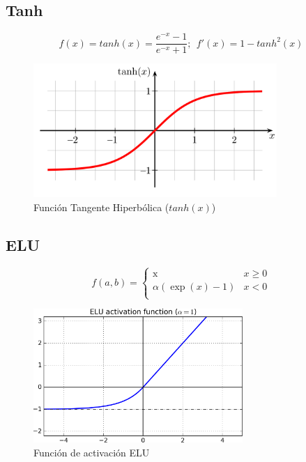 \subsection{Tanh}

\begin{equation}
    f(x)=tanh(x)=\frac{e^{-x}-1}{e^{-x}+1}; \ \ f'(x)=1-tanh^2(x)
\end{equation}
\vspace{1cm}
\hspace{1.5cm}

\newline

\begin{figure}[H]
    \centering
    \includegraphics[height=2in]{image/tanh}
    \caption{Función Tangente Hiperbólica ($tanh(x)$)}
    \label{fig:my_label}
\end{figure}

\subsection{ELU}

\[   
f(a,b) = 
     \begin{cases}
        \text{x} & x \geq 0 \\
       \text{$\alpha (\exp(x)-1)$} & x < 0 \\
     \end{cases}
\]
\vspace{1cm}
\hspace{5.5cm}

\newline
\vspace{1cm}
\hspace{1.5cm}

\newline
\newline

\begin{figure}[H]
    \centering
    \includegraphics[height=2in]{image/ELU}
    \caption{Función de activación ELU}
    \label{fig:my_label}
\end{figure}



